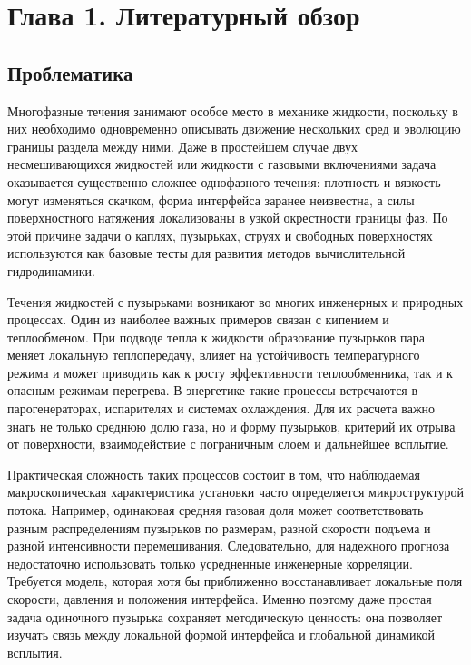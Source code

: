 \documentclass[12pt,a4paper]{article}
\begin{document}
\newpage

\section{Глава 1. Литературный обзор}

\subsection{Проблематика}

Многофазные течения занимают особое место в механике жидкости, поскольку в них
необходимо одновременно описывать движение нескольких сред и эволюцию границы
раздела между ними. Даже в простейшем случае двух несмешивающихся жидкостей или
жидкости с газовыми включениями задача оказывается существенно сложнее
однофазного течения: плотность и вязкость могут изменяться скачком, форма
интерфейса заранее неизвестна, а силы поверхностного натяжения локализованы в
узкой окрестности границы фаз. По этой причине задачи о каплях, пузырьках,
струях и свободных поверхностях используются как базовые тесты для развития
методов вычислительной гидродинамики.

Течения жидкостей с пузырьками возникают во многих инженерных и природных
процессах. Один из наиболее важных примеров связан с кипением и теплообменом.
При подводе тепла к жидкости образование пузырьков пара меняет локальную
теплопередачу, влияет на устойчивость температурного режима и может приводить
как к росту эффективности теплообменника, так и к опасным режимам перегрева.
В энергетике такие процессы встречаются в парогенераторах, испарителях и
системах охлаждения. Для их расчета важно знать не только среднюю долю газа, но
и форму пузырьков, критерий их отрыва от поверхности, взаимодействие с
пограничным слоем и дальнейшее всплытие.

Практическая сложность таких процессов состоит в том, что наблюдаемая
макроскопическая характеристика установки часто определяется микроструктурой
потока. Например, одинаковая средняя газовая доля может соответствовать разным
распределениям пузырьков по размерам, разной скорости подъема и разной
интенсивности перемешивания. Следовательно, для надежного прогноза
недостаточно использовать только усредненные инженерные корреляции. Требуется
модель, которая хотя бы приближенно восстанавливает локальные поля скорости,
давления и положения интерфейса. Именно поэтому даже простая задача
одиночного пузырька сохраняет методическую ценность: она позволяет изучать
связь между локальной формой интерфейса и глобальной динамикой всплытия.
\end{document}
